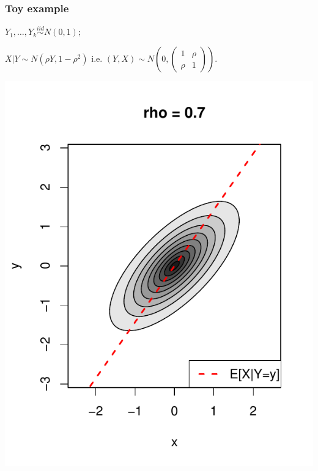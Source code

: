 \documentclass{beamer}
\begin{document}
\begin{frame}
\frametitle{Toy example}
$Y_1,\hdots, Y_k \stackrel{iid}{\sim} N(0, 1);$\pause

$X|Y \sim N(\rho Y, 1-\rho^2)$ i.e. $(Y, X) \sim N(0, \begin{pmatrix}1 & \rho\\\rho & 1\end{pmatrix}).$

\begin{center}
\includegraphics[scale = 0.5, clip = true, trim = 0 0 0 0.5in]{../extrapolation/illus_rho_0_7.pdf}
\end{center}

\end{frame}
\end{document}
